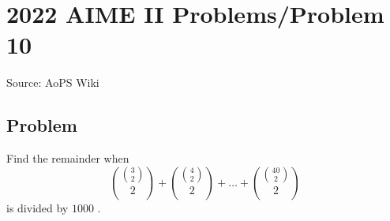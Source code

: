 \documentclass[12pt]{article}
\begin{document}
\section*{{2022 AIME II Problems/Problem 10}}
Source: AoPS Wiki

\subsection*{Problem}
Find the remainder when \[\binom{\binom{3}{2}}{2} + \binom{\binom{4}{2}}{2} + \dots + \binom{\binom{40}{2}}{2}\] is divided by $1000$ .
\end{document}
